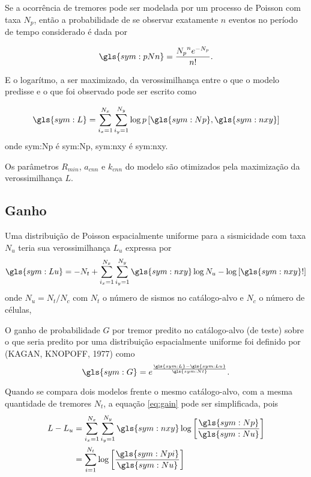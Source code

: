 Se a ocorrência de tremores pode ser modelada por um processo de Poisson com taxa $N_p$, 
então a probabilidade de se observar exatamente $n$ eventos no período de tempo considerado é dada por

\begin{equation}
	\ensuremath{
		\gls{sym:pNn} = \frac{{N_p}^n e^{-N_p}}{n!}.
	}
	\label{eq:loglik}
\end{equation}

E o logarítmo, a ser maximizado, da verossimilhança entre 
o que o modelo predisse e o que foi observado 
pode ser escrito como

\begin{equation}
	\ensuremath{
		\gls{sym:L} = \sum_{i_x=1}^{N_x}\sum_{i_y=1}^{N_y}\log p\left[  \gls{sym:Np}, \gls{sym:nxy}  \right]
	}
	\label{eq:loglik}
\end{equation}
onde \gls{sym:Np} é \glsdesc{sym:Np},
	\gls{sym:nxy} é \glsdesc{sym:nxy}.

Os parâmetros $R_{min}$, $a_{cnn}$ e $k_{cnn}$ do modelo são otimizados 
pela maximização da verossimilhança $L$.

\subsection{Ganho}

Uma distribuição de Poisson espacialmente uniforme para a sismicidade com taxa $N_u$
teria sua verossimilhança $L_u$ expressa por
\begin{equation}
	\ensuremath{
		\gls{sym:Lu} = -N_t + 
		\sum_{i_x = 1}^{N_x}\sum_{i_y=1}^{N_y}
		\gls{sym:nxy}\log N_u - \log \left[ \gls{sym:nxy}! \right]
	}
	\label{eq:lu}
\end{equation}
onde $N_u = N_t/N_c$ com $N_t$ o número de sismos no catálogo-alvo e $N_c$ o número de células, 


O ganho de probabilidade $G$ por tremor predito no catálogo-alvo (de teste)
sobre o que seria predito por uma distribuição espacialmente uniforme 
foi definido por (KAGAN, KNOPOFF, 1977) como
\begin{equation}
	\ensuremath{
		\gls{sym:G} = e^{ \frac{\gls{sym:L} - \gls{sym:Lu}}{\gls{sym:Nt}}   }.
	}
	\label{eq:gain}
\end{equation}

Quando se compara dois modelos frente o mesmo catálogo-alvo, com a mesma quantidade de tremores $N_t$,
a equação \ref{eq:gain} pode ser simplificada, pois 
\begin{equation}
	\ensuremath{
	\begin{align}
		L - L_u & = \sum_{i_x = 1}^{N_x}\sum_{i_y=1}^{N_y}
				  \gls{sym:nxy}\log \left[ \frac{\gls{sym:Np}}{\gls{sym:Nu}} \right] \\
				& = \sum_{i = 1}^{N_t}\log \left[\frac{\gls{sym:Npi}}{\gls{sym:Nu}} \right]
	\end{align}}
	\label{eq:llu}
\end{equation}

